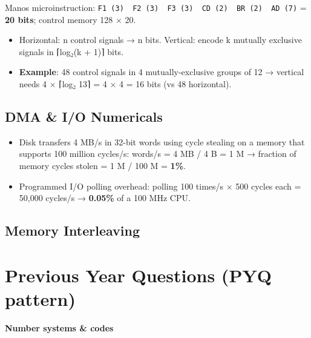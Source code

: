 Mano\textquotesingle s microinstruction: \texttt{F1\ (3)\ \textbar{}\ F2\ (3)\ \textbar{}\ F3\ (3)\ \textbar{}\ CD\ (2)\ \textbar{}\ BR\ (2)\ \textbar{}\ AD\ (7)} = \textbf{20 bits}; control memory 128 × 20.

\begin{itemize}
\tightlist
\item
  Horizontal: n control signals → n bits. Vertical: encode k mutually exclusive signals in ⌈log₂(k + 1)⌉ bits.
\item
  \textbf{Example}: 48 control signals in 4 mutually-exclusive groups of 12 → vertical needs 4 × ⌈log₂ 13⌉ = 4 × 4 = 16 bits (vs 48 horizontal).
\end{itemize}

\needspace{95pt}

\hypertarget{p2-02--117-dma--io-numericals}{%
\subsection{DMA \& I/O Numericals}\label{p2-02--117-dma--io-numericals}}

\begin{itemize}
\tightlist
\item
  Disk transfers 4 MB/s in 32-bit words using cycle stealing on a memory that supports 100 million cycles/s:
  words/s = 4 MB / 4 B = 1 M → fraction of memory cycles stolen = 1 M / 100 M = \textbf{1\%}.
\item
  Programmed I/O polling overhead: polling 100 times/s × 500 cycles each = 50,000 cycles/s → \textbf{0.05\%} of a 100 MHz CPU.
\end{itemize}

\needspace{95pt}

\hypertarget{p2-02--118-memory-interleaving}{%
\subsection{Memory Interleaving}\label{p2-02--118-memory-interleaving}}



\needspace{125pt}

\hypertarget{p2-02--previous-year-questions-pyq-pattern}{%
\section{Previous Year Questions (PYQ pattern)}\label{p2-02--previous-year-questions-pyq-pattern}}

\textbf{Number systems \& codes}

